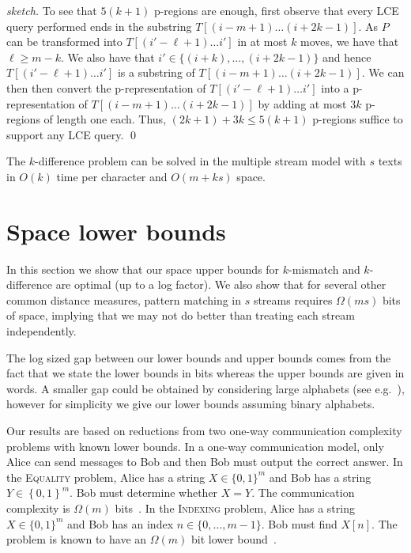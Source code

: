 \documentclass[envcountsame]{llncs}
\renewcommand{\geq}{\geqslant}
\renewcommand{\leq}{\leqslant}
\newcommand{\indexing}{\textsc{Indexing}\xspace}
\newcommand{\equality}{\textsc{Equality}\xspace}
\newcommand{\upto}{\ensuremath{\ldots}}
\newcommand{\pregions}{\mbox{p-regions}\xspace}
\newcommand{\prepresentation}{\mbox{p-representation}\xspace}
\begin{document}
\begin{proof}[sketch]
    To see that $5(k+1)$ \pregions are enough, first observe that every LCE query performed ends in the substring $T[(i-m+1) \ldots (i+2k-1)]$.
    As $P$ can be transformed into $T[(i'-\ell+1)\upto i']$ in at most $k$ moves, we have that $\ell\geq m-k$. We also have that $i'\in\{(i+k), \dots, (i+2k-1)\}$ and hence $T[(i'-\ell+1)\upto i']$ is a substring of $T[(i-m+1) \ldots (i+2k-1)]$. We can then then convert the \prepresentation  of  $T[(i'-\ell+1)\upto i']$ into a \prepresentation of $T[(i-m+1) \ldots (i+2k-1)]$ by adding at most $3k$ \pregions of length one each. Thus, $(2k+1)+3k\leq 5(k+1)$ \pregions suffice to support any LCE query.    \qed
\end{proof}




\begin{theorem}
    The $k$-difference problem can be solved in the multiple stream model with $s$ texts in $O(k)$ time per character and $O(m+ks)$ space.
\end{theorem}


\section{Space lower bounds}\label{sec:space}

In this section we show that our space upper bounds for $k$-mismatch
and $k$-difference are optimal (up to a log factor). We also show
that for several other common distance measures, pattern matching in $s$ streams requires $\Omega(ms)$ bits of space, implying that we may not do better than treating each stream independently.

The log sized gap between our lower bounds and upper bounds comes from
the fact that we state the lower bounds in bits whereas the upper
bounds are given in words. A smaller gap could be obtained by
considering large alphabets (see e.g.\@~\cite{CJPS:2011}), however for
simplicity we give our lower bounds assuming binary alphabets.

Our results are based on reductions from two one-way communication complexity problems with known lower bounds.
In a one-way communication model, only Alice can send messages to Bob and then Bob must output the correct answer.
In the \equality problem, Alice has a string $X\in\{0,1\}^{m}$ and Bob has a string $Y\in\left\{ 0,1\right\} ^{m}$. Bob must determine whether $X=Y$. The communication complexity is $\Omega(m)$ bits~\cite{Kushilevitz:97}.
In the \indexing problem, Alice has a string $X\in\{0,1\}^{m}$ and Bob has an index $n\in\{0,\ldots, m-1\}$. Bob must find $X[n]$. The problem is known to have an $\Omega(m)$ bit lower bound~\cite{Kushilevitz:97}.
\end{document}
